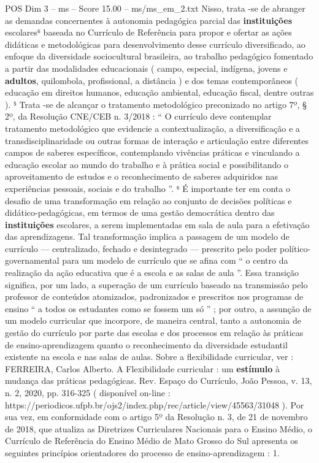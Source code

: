 \begin{textsample}{POS Dim 3 – ms – Score 15.00 – ms/ms\_em\_2.txt}
Nisso, trata -se de abranger as demandas concernentes à autonomia pedagógica parcial das \textbf{instituições} escolares⁶ baseada no Currículo de Referência para propor e ofertar as ações didáticas e metodológicas para desenvolvimento desse currículo diversificado, ao enfoque da diversidade sociocultural brasileira, ao trabalho pedagógico fomentado a partir das modalidades educacionais ( campo, especial, indígena, jovens e \textbf{adultos}, quilombola, profissional, a distância ) e dos temas contemporâneos ( educação em direitos humanos, educação ambiental, educação fiscal, dentre outras ). ⁵ Trata -se de alcançar o tratamento metodológico preconizado no artigo 7º, § 2º, da Resolução CNE/CEB n. 3/2018 : “ O currículo deve contemplar tratamento metodológico que evidencie a contextualização, a diversificação e a transdisciplinaridade ou outras formas de interação e articulação entre diferentes campos de saberes específicos, contemplando vivências práticas e vinculando a educação escolar ao mundo do trabalho e à prática social e possibilitando o aproveitamento de estudos e o reconhecimento de saberes adquiridos nas experiências pessoais, sociais e do trabalho ”. ⁶ É importante ter em conta o desafio de uma transformação em relação ao conjunto de decisões políticas e didático-pedagógicas, em termos de uma gestão democrática dentro das \textbf{instituições} escolares, a serem implementadas em sala de aula para a efetivação das aprendizagens.
Tal transformação implica a passagem de um modelo de currículo — centralizado, fechado e desintegrado — prescrito pelo poder político-governamental para um modelo de currículo que se afina com “ o centro da realização da ação educativa que é a escola e as salas de aula ”.
Essa transição significa, por um lado, a superação de um currículo baseado na transmissão pelo professor de conteúdos atomizados, padronizados e prescritos nos programas de ensino “ a todos os estudantes como se fossem um só ” ; por outro, a assunção de um modelo curricular que incorpore, de maneira central, tanto a autonomia de gestão do currículo por parte das escolas e dos processos em relação às práticas de ensino-aprendizagem quanto o reconhecimento da diversidade estudantil existente na escola e nas salas de aulas.
Sobre a flexibilidade curricular, ver : FERREIRA, Carlos Alberto.
A Flexibilidade curricular : um \textbf{estímulo} à mudança das práticas pedagógicas.
Rev.
Espaço do Currículo, João Pessoa, v. 13, n. 2, 2020, pp. 316-325 ( disponível on-line : https://periodicos.ufpb.br/ojs2/index.php/rec/article/view/45563/31048 ).
Por sua vez, em conformidade com o artigo 5º da Resolução n. 3, de 21 de novembro de 2018, que atualiza as Diretrizes Curriculares Nacionais para o Ensino Médio, o Currículo de Referência do Ensino Médio de Mato Grosso do Sul apresenta os seguintes princípios orientadores do processo de ensino-aprendizagem : 1.

\end{textsample}
